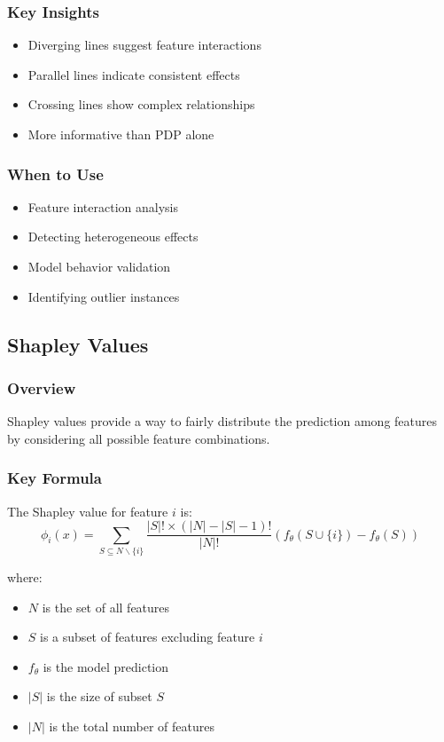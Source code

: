 \documentclass{article}
\begin{document}
\subsubsection{Key Insights}
\begin{itemize}
    \item Diverging lines suggest feature interactions
    \item Parallel lines indicate consistent effects
    \item Crossing lines show complex relationships
    \item More informative than PDP alone
\end{itemize}

\subsubsection{When to Use}
\begin{itemize}
    \item Feature interaction analysis
    \item Detecting heterogeneous effects
    \item Model behavior validation
    \item Identifying outlier instances
\end{itemize}

\subsection{Shapley Values}

\subsubsection{Overview}
Shapley values provide a way to fairly distribute the prediction among features by considering all possible feature combinations.

\subsubsection{Key Formula}
The Shapley value for feature $i$ is:
\begin{equation}
    \phi_i(x) = \sum_{S \subseteq N \backslash\{i\}} \frac{|S|!\times(|N|-|S|-1)!}{|N|!}\left(f_\theta(S \cup\{i\})-f_\theta(S)\right)
\end{equation}

where:
\begin{itemize}
    \item $N$ is the set of all features
    \item $S$ is a subset of features excluding feature $i$
    \item $f_\theta$ is the model prediction
    \item $|S|$ is the size of subset $S$
    \item $|N|$ is the total number of features
\end{itemize}
\end{document}
